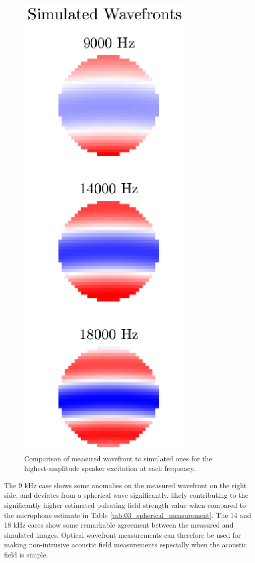 \begin{figure}
  \includegraphics{../matlab/03_aero_optics_acoustics/spherical_plot_simulated.eps}
  \caption{Comparison of measured wavefront to simulated ones for the highest-amplitude speaker excitation at each frequency.}
  \label{fig:03_spherical_plot}
\end{figure}
The 9 kHz case shows some anomalies on the measured wavefront on the right side, and deviates from a spherical wave significantly, likely contributing to the significantly higher estimated pulsating field strength value when compared to the microphone estimate in Table \ref{tab:03_spherical_measurement}.
The 14 and 18 kHz cases show some remarkable agreement between the measured and simulated images.
Optical wavefront measurements can therefore be used for making non-intrusive acoustic field measurements especially when the acoustic field is simple.



